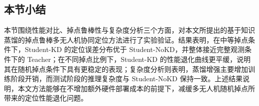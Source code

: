


\subsection{本节小结}
\label{subsec:4_4_6}

本节围绕性能对比、掉点鲁棒性与复杂度分析三个方面，对本文所提出的基于知识蒸馏的掉点鲁棒多无人机协同定位方法进行了实验验证。结果表明，在中等掉点条件下，Student-KD 的定位误差分布优于 Student-NoKD，并整体接近完整观测条件下的 Teacher；在不同掉点比例下，Student-KD 的性能退化曲线更平缓，说明其在随机掉点条件下具有更稳定的表现；复杂度分析则表明，蒸馏增强主要增加训练阶段开销，而测试阶段的推理复杂度与 Student-NoKD 保持一致。上述结果说明，本文方法能够在不增加额外硬件部署成本的前提下，减缓多无人机随机掉点所带来的定位性能退化问题。

